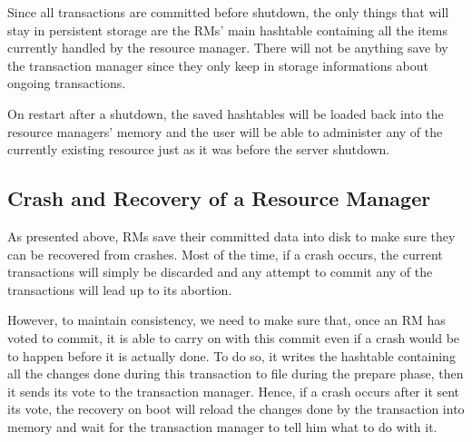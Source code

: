\documentclass[12pt]{article}
\theoremstyle{plain}%
\theoremstyle{definition}
\theoremstyle{remark}
\begin{document}
Since all transactions are committed before shutdown, the only things
that will stay in persistent storage are the RMs' main hashtable
containing all the items currently handled by the resource manager.
There will not be anything save by the transaction manager since
they only keep in storage informations about ongoing transactions.

On restart after a shutdown, the saved hashtables will be loaded
back into the resource managers' memory and the user will be able
to administer any of the currently existing resource just as
it was before the server shutdown.

\subsection{Crash and Recovery of a Resource Manager}

As presented above, RMs save their committed data into disk to make
sure they can be recovered from crashes. Most of the time, if a crash
occurs, the current transactions will simply be discarded and any
attempt to commit any of the transactions will lead up to its abortion.

However, to maintain consistency, we need to make sure that, once an RM
has voted to commit, it is able to carry on with this commit even if
a crash would be to happen before it is actually done. To do so, it 
writes the hashtable containing all the changes done during this
transaction to file during the prepare phase, then it sends its vote to
the transaction manager. Hence, if a crash occurs after it sent its
vote, the recovery on boot will reload the changes done by the
transaction into memory and wait for the transaction manager to tell
him what to do with it.


\end{document}
